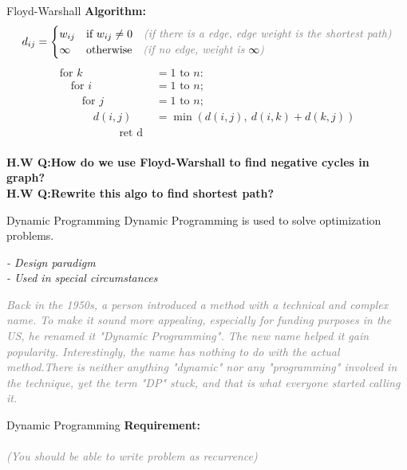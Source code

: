 \begin{frame}{Floyd-Warshall}
\textbf{Algorithm:}
\[
d_{ij} =
\begin{cases}
w_{ij} & \text{if } w_{ij} \neq 0\quad \text{\textit{\textcolor{gray}{(if there is a edge, edge weight is the shortest path)}}} \\
\infty & \text{otherwise}\quad \text{\textit{\textcolor{gray}{(if no edge, weight is }$\infty$\textcolor{gray}{)}}}
\end{cases}
\]
\begin{align*}
\text{for } k &= 1 \text{ to } n:\\
\quad \text{for } i &= 1 \text{ to } n; \\
\quad\quad \text{for } j &= 1 \text{ to } n; \\
\quad\quad\quad d(i,j) &= \min(d(i,j),\ d(i,k) + d(k,j))\\
\quad\quad\quad\quad\quad \text{ ret d } 
\end{align*}
\text{\textit{\textcolor{gray}{(This algo is giving the distance between vertices not the shortest path.)}}} \\
\vspace{1em}
\textbf{H.W Q:How do we use Floyd-Warshall to find negative cycles in graph?}\\
\textbf{H.W Q:Rewrite this algo to find shortest path?}
\end{frame}

\begin{frame}{Dynamic Programming}
Dynamic Programming is used to solve optimization problems.

\vspace{0.5em}
\textit{- Design paradigm} \\
\textit{- Used in special circumstances}

\vspace{1em}
\textit{\textcolor{gray}{
Back in the 1950s, a person introduced a method with a technical and complex name. 
To make it sound more appealing, especially for funding purposes in the US, he renamed it "Dynamic Programming". 
The new name helped it gain popularity. Interestingly, the name has nothing to do with the actual method.There is neither anything "dynamic" nor any "programming" involved in the technique, yet the term "DP" stuck, and that is what everyone started calling it.
}}
\end{frame}

\begin{frame}{Dynamic Programming}
\textbf{Requirement:}\\
\\ \textit{\textcolor{gray}{(You should be able to write problem as recurrence)}}\\
\end{frame}

